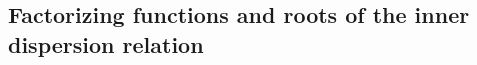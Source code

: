 \documentclass[a4paper,11pt]{article}
\begin{document}

\subsection{Factorizing functions and roots of the inner dispersion relation}
\label{SubSectionFactoDisp}

\end{document}
